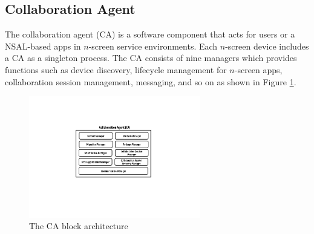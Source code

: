 \documentclass{sig-alternate}
\begin{document}
\subsection{Collaboration Agent}
The collaboration agent (CA) is a software component that acts for users or a NSAL-based apps in $n$-screen service environments.  
Each $n$-screen device includes a CA as a singleton process.
The CA consists of nine managers which provides functions such as device discovery, lifecycle management for $n$-screen apps, collaboration session management, messaging, and so on as shown in Figure \ref{fig:collaborationagent}. 
    \begin{figure}[htb] %
    \centering
    \includegraphics[width=7.5cm,keepaspectratio]{collaborationagent}
    \caption{The CA block architecture}
    \label{fig:collaborationagent}
    \end{figure}
\end{document}
